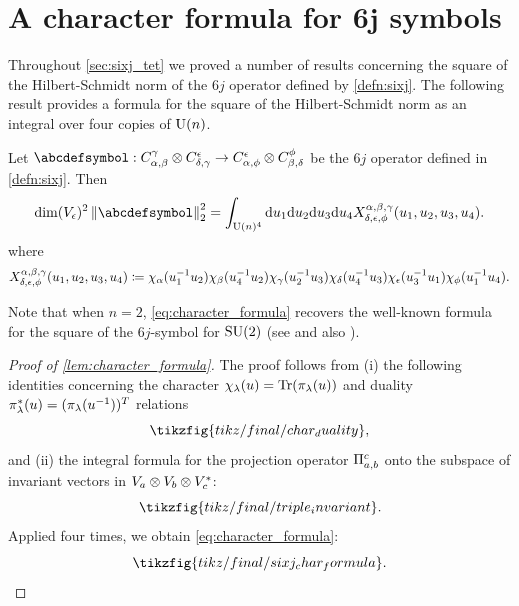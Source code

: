 \documentclass[notitlepage, 10pt]{article}
\begin{document}
\section{A character formula for \texorpdfstring{$\boldsymbol{6j}$}{6j} symbols}

Throughout \cref{sec:sixj_tet} we proved a number of results concerning the square of the Hilbert-Schmidt norm of the $6j$ operator defined by \cref{defn:sixj}.
The following result provides a formula for the square of the Hilbert-Schmidt norm as an integral over four copies of $\operatorname{U}(n)$.


\begin{lem}
    \label{lem:character_formula}
    Let $\abcdefsymbol : C^{\yc}_{\ya,\yb} \ot C^{\ye}_{\yd,\yc} \to C^{\ye}_{\ya, \yf} \ot C^{\yf}_{\yb,\yd}$ be the $6j$ operator defined in \cref{defn:sixj}.
    Then
    \begin{equation}
        \label{eq:character_formula}
        \dim(V_{\ye})^{2}\norm{\abcdefsymbol}_{2}^{2}
        = \int_{\U(n)^{4}} \diff u_1 \diff u_2 \diff u_3 \diff u_4 X^{\ya,\yb,\yc}_{\yd,\ye,\yf}(u_1,u_2,u_3,u_4).
    \end{equation}
    where
    \begin{equation}
        X^{\alpha,\beta,\gamma}_{\delta,\epsilon,\phi}(u_1,u_2,u_3,u_4) \coloneqq \chi_{\alpha}(u_1^{-1}u_2)\chi_{\beta}(u_4^{-1}u_2)\chi_{\gamma}(u_2^{-1}u_3)\chi_{\delta}(u_4^{-1}u_3)\chi_{\epsilon}(u_3^{-1}u_1)\chi_{\phi}(u_1^{-1}u_4).
    \end{equation}
\end{lem}
Note that when $n = 2$, \cref{eq:character_formula} recovers the well-known formula for the square of the $6j$-symbol for $\operatorname{SU}(2)$ (see \cite[Equation (1)]{freidel2003asymptotics} and also \cite{barrett1998classical,freidel2000simple}).

\begin{proof}[Proof of \cref{lem:character_formula}]
    The proof follows from (i) the following identities concerning the character $\chi_{\lambda}(u) = \operatorname{Tr}(\pi_{\lambda}(u))$ and duality $\pi_{\lambda}^{*}(u) = (\pi_{\lambda}(u^{-1}))^{T}$ relations
    \begin{equation}
        \tikzfig{tikz/final/char_duality},
    \end{equation}
    and (ii) the integral formula for the projection operator $\Pi_{a,b}^{c}$ onto the subspace of invariant vectors in $V_{a} \otimes V_{b} \otimes V_{c}^{*}$:
    \begin{equation}
        \tikzfig{tikz/final/triple_invariant}.
    \end{equation}
    Applied four times, we obtain \cref{eq:character_formula}:
    \begin{equation}
        \tikzfig{tikz/final/sixj_char_formula}.
    \end{equation}
\end{proof}
\end{document}
